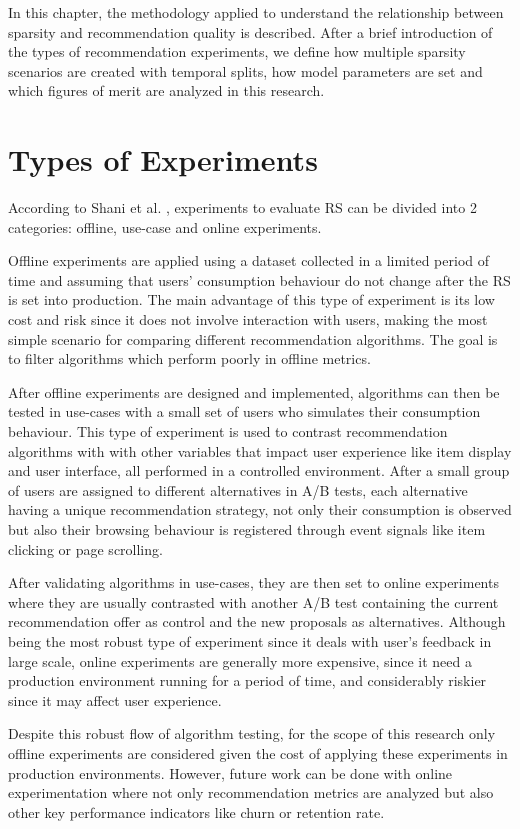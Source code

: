 In this chapter, the methodology applied to understand the relationship between sparsity and recommendation quality is described. After a brief introduction of the types of recommendation experiments, we define how multiple sparsity scenarios are created with temporal splits, how model parameters are set and which figures of merit are analyzed in this research. 

\section{Types of Experiments}

According to Shani et al. \cite{2011EvaluatingRS}, experiments to evaluate RS can be divided into 2 categories: offline, use-case and online experiments. 

Offline experiments are applied using a dataset collected in a limited period of time and assuming that users' consumption behaviour do not change after the RS is set into production. The main advantage of this type of experiment is its low cost and risk since it does not involve interaction with users, making the most simple scenario for comparing different recommendation algorithms. The goal is to filter algorithms which perform poorly in offline metrics.

After offline experiments are designed and implemented, algorithms can then be tested in use-cases with a small set of users who simulates their consumption behaviour. This type of experiment is used to contrast recommendation algorithms with with other variables that impact user experience like item display and user interface, all performed in a controlled environment. After a small group of users are assigned to different alternatives in A/B tests, each alternative having a unique recommendation strategy, not only their consumption is observed but also their browsing behaviour is registered through event signals like item clicking or page scrolling.

After validating algorithms in use-cases, they are then set to online experiments where they are usually contrasted with another A/B test containing the current recommendation offer as control and the new proposals as alternatives. Although being the most robust type of experiment since it deals with user's feedback in large scale, online experiments are generally more expensive, since it need a production environment running for a period of time, and considerably riskier since it may affect user experience. 

Despite this robust flow of algorithm testing, for the scope of this research only offline experiments are considered given the cost of applying these experiments in production environments. However, future work can be done with online experimentation where not only recommendation metrics are analyzed but also other key performance indicators like churn or retention rate.

